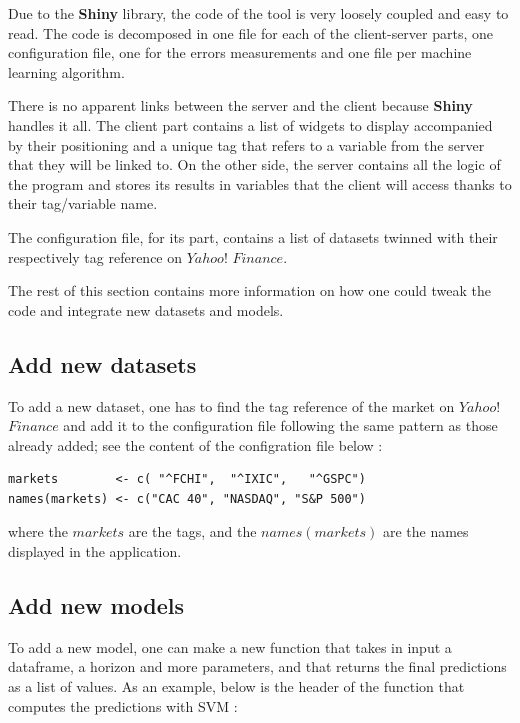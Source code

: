 \documentclass[11pt,a4paper,oneside]{book}
\begin{document}
Due to the \textbf{Shiny} library, the code of the tool is very loosely coupled and easy to read. The code is decomposed in one file for each of the client-server parts, one configuration file, one for the errors measurements and one file per machine learning algorithm. 

There is no apparent links between the server and the client because \textbf{Shiny} handles it all. The client part contains a list of widgets to display accompanied by their positioning and a unique tag that refers to a variable from the server that they will be linked to. On the other side, the server contains all the logic of the program and stores its results in variables that the client will access thanks to their tag/variable name.

The configuration file, for its part, contains a list of datasets twinned with their respectively tag reference on $Yahoo!$ $Finance$. 

The rest of this section contains more information on how one could tweak the code and integrate new datasets and models.


\subsection{Add new datasets}

To add a new dataset, one has to find the tag reference of the market on $Yahoo!$ $Finance$ and add it to the configuration file following the same pattern as those already added; see the content of the configration file below : 


\begin{lstlisting}
markets        <- c( "^FCHI",  "^IXIC",   "^GSPC")
names(markets) <- c("CAC 40", "NASDAQ", "S&P 500")
\end{lstlisting}

where the $markets$ are the tags, and the $names(markets)$ are the names displayed in the application.


\subsection{Add new models}

To add a new model, one can make a new function that takes in input a dataframe, a horizon and more parameters, and that returns the final predictions as a list of values. As an example, below is the header of the function that computes the predictions with SVM : \\
\end{document}
